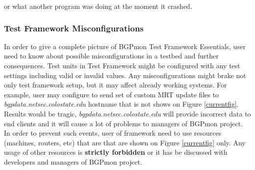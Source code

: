 
or what another program was doing at the moment it crashed.
\subsubsection{Test Framework Misconfigurations}

In order to give a complete picture of BGPmon Test Framework Essentials, user need to know about possible misconfigurations in a testbed and further consequences.  Test units in Test Framework might be  configured with any test settings including valid or invalid values. Any misconfigurations  might brake not only test framework setup, but it may affect already working systems.  For example, user may configure to send set of custom MRT update files to \emph{bgpdata.netsec.colostate.edu} hostname  that is not shows on Figure \ref{currentfig}. Results would be tragic, \emph{bgpdata.netsec.colostate.edu} will  provide incorrect data to end clients and it will cause a lot of problems to managers of BGPmon project.  In order to prevent such events, user of framework need to use resources (machines, routers, etc) that are   that are shown on Figure \ref{currentfig} only.   Any usage of other resources is \textbf{strictly forbidden} or it has be discussed with developers and managers of BGPmon project.






